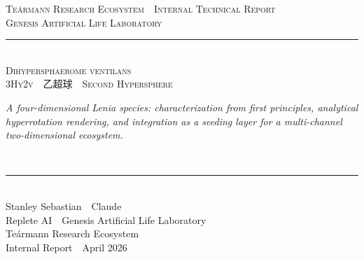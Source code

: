 \documentclass[11pt,a4paper]{article}
\begin{document}
\thispagestyle{empty}
\vspace*{1.2cm}

\begin{center}
  {\sffamily\footnotesize\textcolor{muted}{\textsc{Teármann Research Ecosystem \,\textperiodcentered\, Internal Technical Report}}}\\[3pt]
  {\sffamily\footnotesize\textcolor{muted}{\textsc{Genesis Artificial Life Laboratory}}}\\[28pt]

  {\color{rule}\rule{0.3\linewidth}{0.3pt}}\\[26pt]

  {\fontsize{30}{34}\selectfont\scshape\color{headinc}
    Dihypersphaerome ventilans}\\[12pt]
  {\LARGE\color{accent}\scshape{3\textsc{Hy}2v \,\textperiodcentered\, 乙超球 \,\textperiodcentered\, Second Hypersphere}}\\[22pt]

  \begin{minipage}{0.82\linewidth}
    \centering\itshape\large\color{headinc}
    A four-dimensional Lenia species: characterization from first principles,
    analytical hyperrotation rendering, and integration as a seeding layer
    for a multi-channel two-dimensional ecosystem.
  \end{minipage}\\[32pt]

  {\color{rule}\rule{0.3\linewidth}{0.3pt}}\\[32pt]

  {\large Stanley Sebastian \,\textperiodcentered\, Claude}\\[4pt]
  {\sffamily\small\textcolor{muted}{Replete AI \,\textperiodcentered\, Genesis Artificial Life Laboratory}}\\[2pt]
  {\sffamily\small\textcolor{muted}{Teármann Research Ecosystem}}\\[18pt]
  {\sffamily\footnotesize\textcolor{muted}{Internal Report \,\textperiodcentered\, April 2026}}
\end{center}

\vfill
\end{document}
